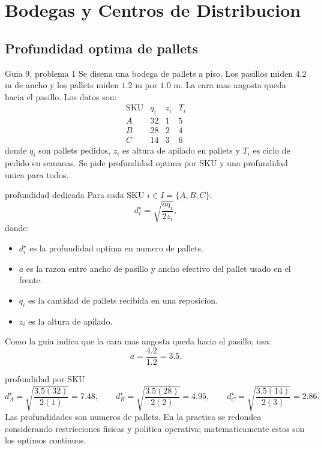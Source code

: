 \section{Bodegas y Centros de Distribucion}

\subsection{Profundidad optima de pallets}

\begin{ejercicio}{Guia 9, problema 1}
Se disena una bodega de pallets a piso. Los pasillos miden $4.2$ m de ancho y los pallets miden $1.2$ m por $1.0$ m. La cara mas angosta queda hacia el pasillo. Los datos son:
\[
\begin{array}{c|ccc}
\text{SKU} & q_i & z_i & T_i\\
\hline
A&32&1&5\\
B&28&2&4\\
C&14&3&6
\end{array}
\]
donde $q_i$ son pallets pedidos, $z_i$ es altura de apilado en pallets y $T_i$ es ciclo de pedido en semanas. Se pide profundidad optima por SKU y una profundidad unica para todos.
\end{ejercicio}

\begin{materia}{profundidad dedicada}
Para cada SKU $i\in I=\{A,B,C\}$:
\[
  d_i^\star=\sqrt{\frac{a q_i}{2 z_i}},
\]
donde:
\begin{itemize}
  \item $d_i^\star$ es la profundidad optima en numero de pallets.
  \item $a$ es la razon entre ancho de pasillo y ancho efectivo del pallet usado en el frente.
  \item $q_i$ es la cantidad de pallets recibida en una reposicion.
  \item $z_i$ es la altura de apilado.
\end{itemize}
Como la guia indica que la cara mas angosta queda hacia el pasillo, usa:
\[
  a=\frac{4.2}{1.2}=3.5.
\]
\end{materia}

\begin{solucion}{profundidad por SKU}
\[
d_A^\star=\sqrt{\frac{3.5(32)}{2(1)}}=7.48,
\qquad
d_B^\star=\sqrt{\frac{3.5(28)}{2(2)}}=4.95,
\qquad
d_C^\star=\sqrt{\frac{3.5(14)}{2(3)}}=2.86.
\]
Las profundidades son numeros de pallets. En la practica se redondea considerando restricciones fisicas y politica operativa; matematicamente estos son los optimos continuos.
\end{solucion}

